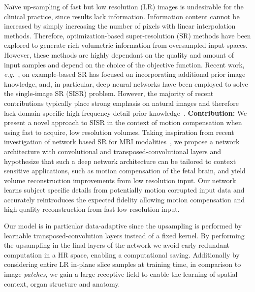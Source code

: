 \documentclass[runningheads,a4paper]{llncs}
\newcommand{\todo}[1]{}
\renewcommand{\todo}[1]{{\color{red} TODO: {#1}}}
\begin{document}
Na\"ive up-sampling of fast but low resolution (LR) images is undesirable for the clinical practice, since results lack information. Information content cannot be increased by simply increasing the number of pixels with linear interpolation methods. Therefore, optimization-based super-resolution (SR) methods have been explored to generate rich volumetric information from oversampled input spaces. However, these methods are highly dependant on the quality and amount of input samples and depend on the choice of the objective function. Recent work, \emph{e.g.}~\cite{Dong2016a}, on example-based SR has focused on incorporating additional prior image knowledge, and, in particular, deep neural networks have been employed to solve the single-image SR (SISR) problem. However, the majority of recent contributions typically place strong emphasis on natural images and therefore lack domain specific high-frequency detail prior knowledge~\cite{Borman1998}.
\newline
\newline
\noindent \textbf{Contribution:}
We present a novel approach to SISR in the context of motion compensation when using fast to acquire, low resolution volumes. Taking inspiration from recent investigation of network based SR for MRI modalities~\cite{Oktay2016}, we propose a network architecture with convolutional and transposed-convolutional layers and hypothesize that such a deep network architecture can be tailored to context sensitive applications, such as motion compensation of the fetal brain, and yield volume reconstruction improvements from low resolution input. Our network learns subject specific details from potentially motion corrupted input data and accurately reintroduces the expected fidelity allowing motion compensation and high quality reconstruction from fast low resolution input. 

Our model is in particular data-adaptive since the upsampling is performed by learnable transposed-convolution layers instead of a fixed kernel. By performing the upsampling in the final layers of the network we avoid early redundant computation in a HR space, enabling a computational saving. Additionally by considering entire LR in-plane slice samples at training time, in comparison to image \emph{patches}, we gain a large receptive field to enable the learning of spatial context, organ structure and anatomy.  %
\end{document}
